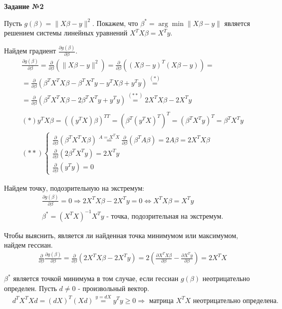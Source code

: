 \documentclass{report}
\begin{document}
\newpage
\par \textbf{Задание №2}

\par Пусть $ g(\beta) = \|X \beta - y\|^2$. Покажем, что $\beta^* = \arg \min \|X\beta - y\|$ является решением системы линейных уравнений $X^T X\beta = X^T y$.

\par Найдем градиент $\frac{\partial g(\beta)}{\partial \beta}$.
\begin{align*}
& \frac{\partial g(\beta)}{\partial \beta} = \frac{\partial}{\partial \beta} \left( \|X\beta - y\|^2 \right) =
\frac{\partial}{\partial \beta} \left( (X\beta - y)^T (X\beta - y) \right) = \\
& = \frac{\partial}{\partial \beta} (\beta^T X^T X \beta - \beta^T X^T y - y^T X \beta + y^T y) \overset{(*)}{=} \\
& = \frac{\partial}{\partial \beta} (\beta^T X^T X \beta - 2 \beta^T X^T y + y^T y) \overset{(**)}{=} 2 X^T X \beta - 2 X^T y \\ \\
& (*) y^T X \beta = ((y^T X) \beta)^{T T} = (\beta^T (y^T X)^T)^T = (\beta^T X^T y)^T = \beta^T X^T y \\
& (**) \begin{cases}
    \frac{\partial}{\partial \beta} (\beta^T X^T X \beta) \overset{A = X^T X}{=} \frac{\partial}{\partial \beta} (\beta^T A \beta) = 2A \beta = 2 X^T X \beta \\
    \frac{\partial}{\partial \beta} (2 \beta^T X^T y) = 2X^T y \\
    \frac{\partial}{\partial \beta} (y^T y) = 0
\end{cases}
\end{align*}

\par Найдем точку, подозрительную на экстремум:
\begin{align*}
& \frac{\partial g(\beta)}{\partial \beta} = 0 \Rightarrow 2 X^T X \beta - 2 X^T y = 0 \Leftrightarrow X^T X \beta = X^T y \\
& \beta^* = (X^T X)^{-1} X^T y \text{ - точка, подозрительная на экстремум.}
\end{align*}

\par Чтобы выяснить, является ли найденная точка минимумом или максимумом, найдем гессиан.
\begin{align*}
& \frac{\partial}{\partial \beta} \frac{\partial g(\beta)}{\partial \beta} = \frac{\partial}{\partial \beta} (2X^T X \beta - 2 X^T y) = 2 \left( \frac{\partial X^T X \beta}{\partial \beta} - \frac{\partial X^T y}{\partial \beta} \right) = 2X^T X
\end{align*}
\par $\beta^*$ является точкой минимума в том случае, если гессиан $g(\beta)$ неотрицательно определен. Пусть $d \neq 0$ - произвольный вектор.
\begin{align*}
& d^T X^T X d = (d X)^T (X d) \overset{y=d X}{=} y^T y \geq 0 \Rightarrow \text{ матрица } X^T X \text{ неотрицательно определена.}
\end{align*}
\end{document}
